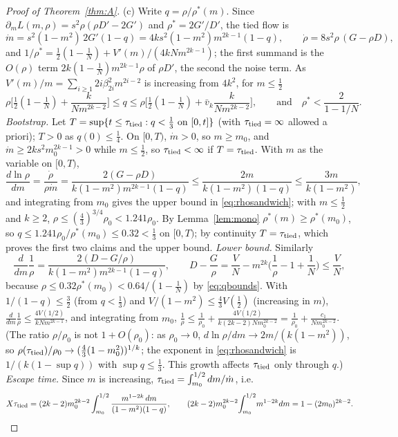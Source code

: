 \begin{proof}[Proof of Theorem~\ref{thm:A}]
(c) Write $q=\rho/\rho^*(m)$. Since $\partial_mL(m,\rho)=s^2\rho(\rho D'-2G')$ and $\rho^*=2G'/D'$, the tied flow is
\[
\dot m=s^2(1-m^2)\,2G'(1-q)=4ks^2(1-m^2)m^{2k-1}(1-q),\qquad \dot\rho=8s^2\rho\,(G-\rho D),
\]
and $1/\rho^*=\frac12(1-\frac1N)+V'(m)/(4kNm^{2k-1})$; the first summand is the $O(\rho)$ term $2k(1-\frac1N)m^{2k-1}\rho$ of $\rho D'$, the second the
noise term. As $V'(m)/m=\sum_{i\ge1}2i\beta_{2i}^2m^{2i-2}$ is increasing from $4k^2$, for $m\le\frac12$
\begin{equation}\label{eq:qbounds}
\rho\Big[\tfrac12(1-\tfrac1N)+\frac{k}{Nm^{2k-2}}\Big]\le q\le\rho\Big[\tfrac12(1-\tfrac1N)+\bar v_k\frac{k}{Nm^{2k-2}}\Big],\qquad\text{and}\quad \rho^*<\frac2{1-1/N}.
\end{equation}
\emph{Bootstrap.} Let $T=\sup\{t\le\tau_{\rm tied}:q<\frac13\text{ on }[0,t]\}$ (with $\tau_{\rm tied}=\infty$ allowed a priori); $T>0$ as $q(0)\le\frac14$. On $[0,T)$, $\dot m>0$, so $m\ge m_0$, and $\dot m\ge
2ks^2m_0^{2k-1}>0$ while $m\le\frac12$, so $\tau_{\rm tied}<\infty$ if $T=\tau_{\rm tied}$. With $m$ as the variable on $[0,T)$,
\[
\frac{d\ln\rho}{dm}=\frac{\dot\rho}{\rho\dot m}=\frac{2(G-\rho D)}{k(1-m^2)m^{2k-1}(1-q)}\le\frac{2m}{k(1-m^2)(1-q)}\le\frac{3m}{k(1-m^2)} ,
\]
and integrating from $m_0$ gives the upper bound in \eqref{eq:rhosandwich}; with $m\le\frac12$ and $k\ge2$, $\rho\le(\frac43)^{3/4}\rho_0<1.241\rho_0$. By Lemma~\ref{lem:mono}
$\rho^*(m)\ge\rho^*(m_0)$, so $q\le1.241\rho_0/\rho^*(m_0)\le0.32<\frac13$ on $[0,T)$; by continuity $T=\tau_{\rm tied}$, which proves the first two claims and the
upper bound. \emph{Lower bound.} Similarly
\[
\frac{d}{dm}\frac1\rho=\frac{2(D-G/\rho)}{k(1-m^2)m^{2k-1}(1-q)},\qquad D-\frac G\rho=\frac VN-m^{2k}\Big(\frac1\rho-1+\frac1N\Big)\le\frac VN ,
\]
because $\rho\le0.32\rho^*(m_0)<0.64/(1-\frac1N)$ by \eqref{eq:qbounds}. With $1/(1-q)\le\frac32$ (from $q<\frac13$) and $V/(1-m^2)\le\frac43V(\frac12)$ (increasing in $m$),
$\frac{d}{dm}\frac1\rho\le\frac{4V(1/2)}{kNm^{2k-1}}$, and integrating from $m_0$, $\frac1\rho\le\frac1{\rho_0}+\frac{4V(1/2)}{k(2k-2)Nm_0^{2k-2}}=\frac1{\rho_0}+\frac{c_1}{Nm_0^{2k-2}}$.
(The ratio $\rho/\rho_0$ is not $1+O(\rho_0)$: as $\rho_0\to0$, $d\ln\rho/dm\to2m/(k(1-m^2))$, so $\rho(\tau_{\rm tied})/\rho_0\to(\frac43(1-m_0^2))^{1/k}$; the exponent in
\eqref{eq:rhosandwich} is $1/(k(1-\sup q))$ with $\sup q\le\frac13$. This growth affects $\tau_{\rm tied}$ only through $q$.)
\emph{Escape time.} Since $m$ is increasing, $\tau_{\rm tied}=\int_{m_0}^{1/2}dm/\dot m$, i.e.
\[
X\tau_{\rm tied}=(2k-2)m_0^{2k-2}\int_{m_0}^{1/2}\frac{m^{1-2k}\,dm}{(1-m^2)(1-q)},\qquad (2k-2)m_0^{2k-2}\!\int_{m_0}^{1/2}\!m^{1-2k}dm=1-(2m_0)^{2k-2}.
\]
\end{proof}
